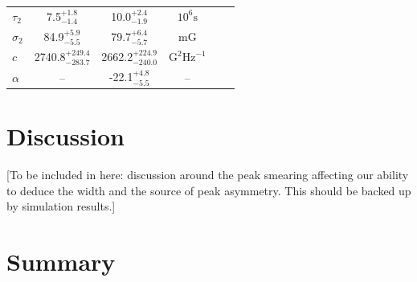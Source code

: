 \begin{table}[ht!]
\begin{center}
\begin{tabular}{l c c c c r}
			{$\tau_2$} & {7.5$_{-1.4}^{+1.8}$} & {10.0$_{-1.9}^{+2.4}$} & {$10^6 \mathrm{s}$} \\	
			
			{$\sigma_2$} & {84.9$_{-5.5}^{+5.9}$} & {79.7$_{-5.7}^{+6.4}$} & {$\mathrm{mG}$} \\	
			
			{$c$} & {2740.8$_{-283.7}^{+249.4}$} & {2662.2$_{-240.0}^{+224.9}$} & {$\mathrm{G}^2\mathrm{Hz}^{-1}$} \\	
			
			{$\alpha$} & {--} & {-22.1$_{-5.5}^{+4.8}$} & {--} \\	
			\hline
		\end{tabular}
	\end{center}
\end{table}


\section{Discussion}\label{sec:SMMF_artificial}

[To be included in here: discussion around the peak smearing affecting our ability to deduce the width and the source of peak asymmetry. This should be backed up by simulation results.]








\section{Summary}\label{sec:SMMF_summary}